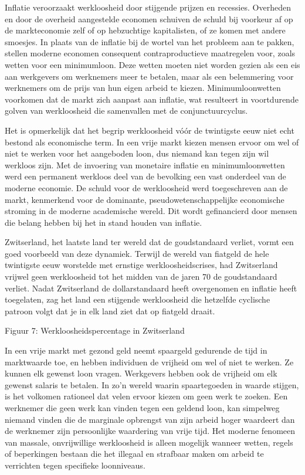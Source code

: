 Inflatie veroorzaakt werkloosheid door stijgende prijzen en recessies.
Overheden en door de overheid aangestelde economen schuiven de schuld
bij voorkeur af op de markteconomie zelf of op hebzuchtige kapitalisten,
of ze komen met andere smoesjes. In plaats van de inflatie bij de wortel
van het probleem aan te pakken, stellen moderne economen consequent
contraproductieve maatregelen voor, zoals wetten voor een minimumloon.
Deze wetten moeten niet worden gezien als een eis aan werkgevers om
werknemers meer te betalen, maar als een belemmering voor werknemers om
de prijs van hun eigen arbeid te kiezen. Minimumloonwetten voorkomen dat
de markt zich aanpast aan inflatie, wat resulteert in voortdurende
golven van werkloosheid die samenvallen met de conjunctuurcyclus.

Het is opmerkelijk dat het begrip werkloosheid vóór de twintigste eeuw
niet echt bestond als economische term. In een vrije markt kiezen mensen
ervoor om wel of niet te werken voor het aangeboden loon, dus niemand
kan tegen zijn wil werkloos zijn. Met de invoering van monetaire
inflatie en minimumloonwetten werd een permanent werkloos deel van de
bevolking een vast onderdeel van de moderne economie. De schuld voor de
werkloosheid werd toegeschreven aan de markt, kenmerkend voor de
dominante, pseudowetenschappelijke economische stroming in de moderne
academische wereld. Dit wordt gefinancierd door mensen die belang hebben
bij het in stand houden van inflatie.

Zwitserland, het laatste land ter wereld dat de goudstandaard verliet,
vormt een goed voorbeeld van deze dynamiek. Terwijl de wereld van
fiatgeld de hele twintigste eeuw worstelde met ernstige
werkloosheidscrises, had Zwitserland vrijwel geen werkloosheid tot het
midden van de jaren 70 de goudstandaard verliet.\autocite{42} Nadat
Zwitserland de dollarstandaard heeft overgenomen en inflatie heeft
toegelaten, zag het land een stijgende werkloosheid die hetzelfde
cyclische patroon volgt dat je in elk land ziet dat op fiatgeld draait.

Figuur 7: Werkloosheidspercentage in Zwitserland

In een vrije markt met gezond geld neemt spaargeld gedurende de tijd in
marktwaarde toe, en hebben individuen de vrijheid om wel of niet te
werken. Ze kunnen elk gewenst loon vragen. Werkgevers hebben ook de
vrijheid om elk gewenst salaris te betalen. In zo'n
wereld waarin spaartegoeden in waarde stijgen, is het volkomen rationeel
dat velen ervoor kiezen om geen werk te zoeken. Een werknemer die geen
werk kan vinden tegen een geldend loon, kan simpelweg niemand vinden die
de marginale opbrengst van zijn arbeid hoger waardeert dan de werknemer
zijn persoonlijke waardering van vrije tijd. Het moderne fenomeen van
massale, onvrijwillige werkloosheid is alleen mogelijk wanneer wetten,
regels of beperkingen bestaan die het illegaal en strafbaar maken om
arbeid te verrichten tegen specifieke loonniveaus.

